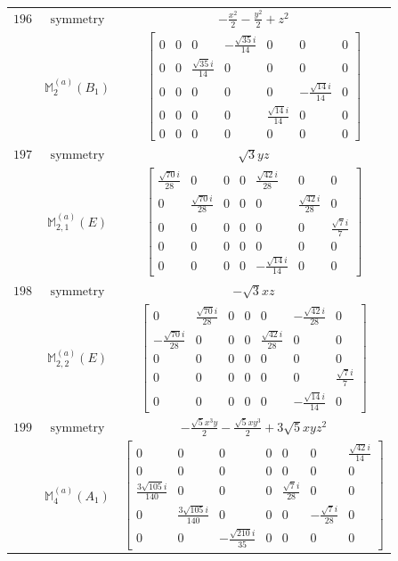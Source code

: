 \documentclass[fleqn,8pt,landscape]{jsarticle}
\begin{document}
\begin{longtable}{ccc}
$ 196 $ & $ \text{symmetry} $ & $ - \frac{x^{2}}{2} - \frac{y^{2}}{2} + z^{2} $ \\
$  $ & $ \mathbb{M}_{2}^{(a)}(B_{1}) $ & $ \begin{bmatrix} 0 & 0 & 0 & - \frac{\sqrt{35} i}{14} & 0 & 0 & 0 \\ 0 & 0 & \frac{\sqrt{35} i}{14} & 0 & 0 & 0 & 0 \\ 0 & 0 & 0 & 0 & 0 & - \frac{\sqrt{14} i}{14} & 0 \\ 0 & 0 & 0 & 0 & \frac{\sqrt{14} i}{14} & 0 & 0 \\ 0 & 0 & 0 & 0 & 0 & 0 & 0 \end{bmatrix} $ \\ \hline
$ 197 $ & $ \text{symmetry} $ & $ \sqrt{3} y z $ \\
$  $ & $ \mathbb{M}_{2,1}^{(a)}(E) $ & $ \begin{bmatrix} \frac{\sqrt{70} i}{28} & 0 & 0 & 0 & \frac{\sqrt{42} i}{28} & 0 & 0 \\ 0 & \frac{\sqrt{70} i}{28} & 0 & 0 & 0 & \frac{\sqrt{42} i}{28} & 0 \\ 0 & 0 & 0 & 0 & 0 & 0 & \frac{\sqrt{7} i}{7} \\ 0 & 0 & 0 & 0 & 0 & 0 & 0 \\ 0 & 0 & 0 & 0 & - \frac{\sqrt{14} i}{14} & 0 & 0 \end{bmatrix} $ \\ \hline
$ 198 $ & $ \text{symmetry} $ & $ - \sqrt{3} x z $ \\
$  $ & $ \mathbb{M}_{2,2}^{(a)}(E) $ & $ \begin{bmatrix} 0 & \frac{\sqrt{70} i}{28} & 0 & 0 & 0 & - \frac{\sqrt{42} i}{28} & 0 \\ - \frac{\sqrt{70} i}{28} & 0 & 0 & 0 & \frac{\sqrt{42} i}{28} & 0 & 0 \\ 0 & 0 & 0 & 0 & 0 & 0 & 0 \\ 0 & 0 & 0 & 0 & 0 & 0 & \frac{\sqrt{7} i}{7} \\ 0 & 0 & 0 & 0 & 0 & - \frac{\sqrt{14} i}{14} & 0 \end{bmatrix} $ \\ \hline
$ 199 $ & $ \text{symmetry} $ & $ - \frac{\sqrt{5} x^{3} y}{2} - \frac{\sqrt{5} x y^{3}}{2} + 3 \sqrt{5} x y z^{2} $ \\
$  $ & $ \mathbb{M}_{4}^{(a)}(A_{1}) $ & $ \begin{bmatrix} 0 & 0 & 0 & 0 & 0 & 0 & \frac{\sqrt{42} i}{14} \\ 0 & 0 & 0 & 0 & 0 & 0 & 0 \\ \frac{3 \sqrt{105} i}{140} & 0 & 0 & 0 & \frac{\sqrt{7} i}{28} & 0 & 0 \\ 0 & \frac{3 \sqrt{105} i}{140} & 0 & 0 & 0 & - \frac{\sqrt{7} i}{28} & 0 \\ 0 & 0 & - \frac{\sqrt{210} i}{35} & 0 & 0 & 0 & 0 \end{bmatrix} $ \\ \hline

\end{longtable}
\end{document}
